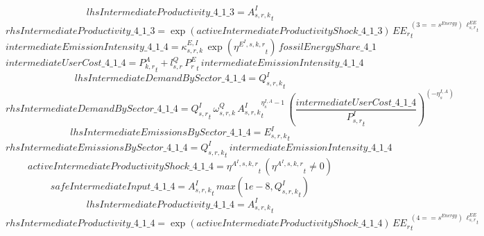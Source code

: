 \begin{dmath*}
lhsIntermediateProductivity\_4\_1\_3 = {{A^{I}_{s,r,k}}}_{t}
\end{dmath*}
\begin{dmath*}
rhsIntermediateProductivity\_4\_1\_3 = \exp\left({activeIntermediateProductivityShock\_4\_1\_3}\right)\, {{EE_r}}_{t}^{\left(3=={{s^{Energy}}}\right)\, {{\ell^{EE}_{s,r}}}_{t}}
\end{dmath*}
\begin{dmath*}
intermediateEmissionIntensity\_4\_1\_4 = {{\kappa^{E,I}_{s,r,k}}}\, \exp\left({{\eta^{E^{I},s,k,r}}}_{t}\right)\, {fossilEnergyShare\_4\_1}
\end{dmath*}
\begin{dmath*}
intermediateUserCost\_4\_1\_4 = {{P^{A}_{k,r}}}_{t}+{{l^{Q}_{s,r}}}\, {{P^E_r}}_{t}\, {intermediateEmissionIntensity\_4\_1\_4}
\end{dmath*}
\begin{dmath*}
lhsIntermediateDemandBySector\_4\_1\_4 = {{Q^{I}_{s,r,k}}}_{t}
\end{dmath*}
\begin{dmath*}
rhsIntermediateDemandBySector\_4\_1\_4 = {{Q^{I}_{s,r}}}_{t}\, {{\omega^{Q}_{s,r,k}}}\, {{A^{I}_{s,r,k}}}_{t}^{{{\eta^{I,A}_{s}}}-1}\, \left(\frac{{intermediateUserCost\_4\_1\_4}}{{{P^{I}_{s,r}}}_{t}}\right)^{\left(-{{\eta^{I,A}_{s}}}\right)}
\end{dmath*}
\begin{dmath*}
lhsIntermediateEmissionsBySector\_4\_1\_4 = {{E^I_{s,r,k}}}_{t}
\end{dmath*}
\begin{dmath*}
rhsIntermediateEmissionsBySector\_4\_1\_4 = {{Q^{I}_{s,r,k}}}_{t}\, {intermediateEmissionIntensity\_4\_1\_4}
\end{dmath*}
\begin{dmath*}
activeIntermediateProductivityShock\_4\_1\_4 = {{\eta^{A^{I},s,k,r}}}_{t}\, \left({{\eta^{A^{I},s,k,r}}}_{t}\neq 0\right)
\end{dmath*}
\begin{dmath*}
safeIntermediateInput\_4\_1\_4 = {{A^{I}_{s,r,k}}}_{t}\, max(1e-8,{{Q^{I}_{s,r,k}}}_{t})
\end{dmath*}
\begin{dmath*}
lhsIntermediateProductivity\_4\_1\_4 = {{A^{I}_{s,r,k}}}_{t}
\end{dmath*}
\begin{dmath*}
rhsIntermediateProductivity\_4\_1\_4 = \exp\left({activeIntermediateProductivityShock\_4\_1\_4}\right)\, {{EE_r}}_{t}^{\left(4=={{s^{Energy}}}\right)\, {{\ell^{EE}_{s,r}}}_{t}}
\end{dmath*}
